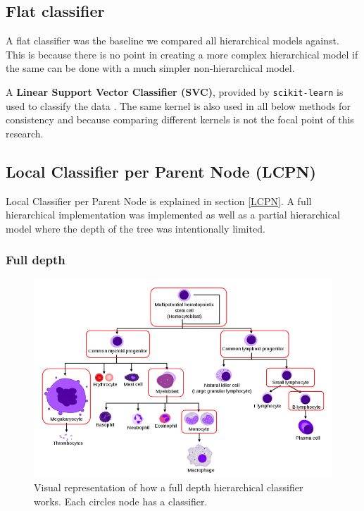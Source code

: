 \documentclass{article}
\begin{document}
\subsection{Flat classifier}

A flat classifier was the baseline we compared all hierarchical models against. This is because there is no point in creating a more complex hierarchical model if the same can be done with a much simpler non-hierarchical model.

A \textbf{Linear Support Vector Classifier (SVC)}, provided by \verb|scikit-learn| is used to classify the data \cite{scikit-learn}.
The same kernel is also used in all below methods for consistency and because comparing different kernels is not the focal point of this research.

\subsection{Local Classifier per Parent Node (LCPN)}
Local Classifier per Parent Node is explained in section \ref{LCPN}. A full hierarchical implementation was implemented as well as a partial hierarchical model where the depth of the tree was intentionally limited.

\subsubsection{Full depth}
\begin{figure}[ht]
\vskip 0.2in
\begin{center}
\centerline{\includegraphics[width=5in]{images/full-hyr.png}}
\caption{Visual representation of how a full depth hierarchical classifier works. Each circles node has a classifier.}
\label{full-hyr}
\end{center}
\vskip -0.2in
\end{figure}
\end{document}
